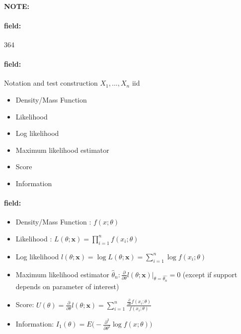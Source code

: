 \documentclass[12pt]{article}
\newenvironment{note}{\paragraph{NOTE:}}{}
\newenvironment{field}{\paragraph{field:}}{}
\begin{document}
\begin{note}
    \begin{field}
        \tiny 364
    \end{field}
    \begin{field}
        Notation and test construction $X_1, \ldots, X_n$ iid
        \begin{itemize}
          \item Density/Mass Function
          \item Likelihood
          \item Log likelihood
          \item Maximum likelihood estimator
          \item Score
          \item Information
        \end{itemize}
    \end{field}
    \begin{field}
      \begin{itemize}
        \item Density/Mass Function : $f(x;\theta)$
        \item Likelihood : $L(\theta;\mathbf{x}) = \prod_{i=1}^n f(x_i;\theta)$
        \item Log likelihood $l(\theta;\mathbf{x}) = \log L(\theta;\mathbf{x}) = \sum_{i=1}^n \log f(x_i;\theta)$
        \item Maximum likelihood estimator $\hat{\theta}_n : \frac{\partial}{\partial \theta} l(\theta;\mathbf{x})\bigg|_{\theta = \hat{\theta_n}} = 0$ (except if support depends on parameter of interest)
        \item Score: $U(\theta) = \frac{\partial}{\partial \theta} l(\theta;\mathbf{x}) = \sum_{i=1}^n \frac{\frac{\partial}{\partial \theta}f(x_i;\theta)}{f(x_i;\theta)} $
        \item Information: $I_1(\theta) = E\bigg(- \frac{\partial^2}{\partial \theta^2} \log f(x; \theta)\bigg)$
      \end{itemize}
    \end{field}
\end{note}
\end{document}
